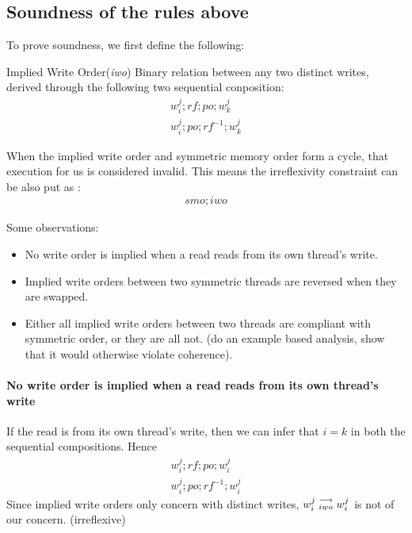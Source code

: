 \subsection{Soundness of the rules above}

    To prove soundness, we first define the following: 

    \begin{definition}{Implied Write Order(\emph{iwo})}
        Binary relation between any two distinct writes, derived through the following two sequential conposition:  
        \begin{align*}
            w_i^j;rf;po;w_k^j \\
            w_i^j;po;rf^{-1};w_k^j
        \end{align*}
    \end{definition}

    When the implied write order and symmetric memory order form a cycle, that execution for us is considered invalid. This means the irreflexivity constraint can be also put as :
    \begin{align*}
        smo;iwo
    \end{align*}

    Some observations:
    \begin{itemize}
        \item No write order is implied when a read reads from its own thread's write.
        \item Implied write orders between two symmetric threads are reversed when they are swapped.
        \item Either all implied write orders between two threads are compliant with symmetric order, or they are all not. (do an example based analysis, show that it would otherwise violate coherence).
    \end{itemize}

    \paragraph{No write order is implied when a read reads from its own thread's write}
        If the read is from its own thread's write, then we can infer that $i=k$ in both the sequential compositions. Hence  
        \begin{align*}
            w_i^j;rf;po;w_i^j \\
            w_i^j;po;rf^{-1};w_i^j
        \end{align*} 
        Since implied write orders only concern with distinct writes, $w_i^j\stackrel{\longrightarrow}{_{iwo}}w_i^j$ is not of our concern. (irreflexive)

